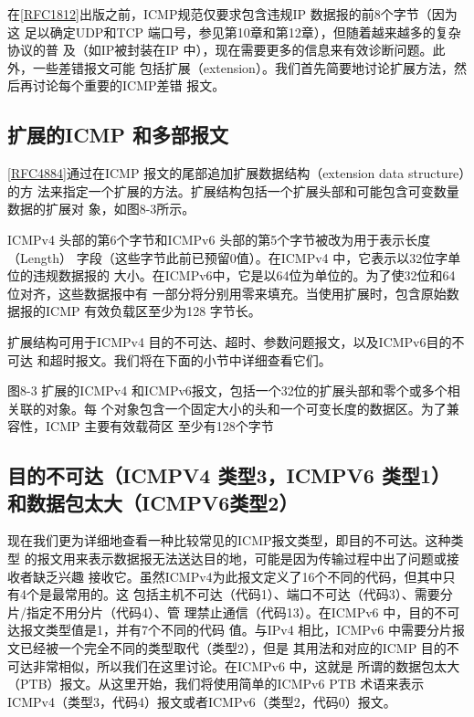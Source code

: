 在\href{https://www.rfc-editor.org/rfc/rfc1812}{[RFC1812]}出版之前，ICMP规范仅要求包含违规IP 数据报的前8个字节（因为这
足以确定UDP和TCP 端口号，参见第10章和第12章），但随着越来越多的复杂协议的普
及（如IP被封装在IP 中），现在需要更多的信息来有效诊断问题。此外，一些差错报文可能
包括扩展（extension）。我们首先简要地讨论扩展方法，然后再讨论每个重要的ICMP差错
报文。

\subsection{扩展的ICMP 和多部报文}
\href{https://www.rfc-editor.org/rfc/rfc4884}{[RFC4884]}通过在ICMP 报文的尾部追加扩展数据结构（extension data structure）的方
法来指定一个扩展的方法。扩展结构包括一个扩展头部和可能包含可变数量数据的扩展对
象，如图8-3所示。

ICMPv4 头部的第6个字节和ICMPv6 头部的第5个字节被改为用于表示长度（Length）
字段（这些字节此前已预留0值）。在ICMPv4 中，它表示以32位字单位的违规数据报的
大小。在ICMPv6中，它是以64位为单位的。为了使32位和64位对齐，这些数据报中有
一部分将分别用零来填充。当使用扩展时，包含原始数据报的ICMP 有效负载区至少为128
字节长。

扩展结构可用于ICMPv4 目的不可达、超时、参数问题报文，以及ICMPv6目的不可达
和超时报文。我们将在下面的小节中详细查看它们。

图8-3 扩展的ICMPv4 和ICMPv6报文，包括一个32位的扩展头部和零个或多个相关联的对象。每
个对象包含一个固定大小的头和一个可变长度的数据区。为了兼容性，ICMP 主要有效载荷区
至少有128个字节

\subsection{目的不可达（ICMPV4 类型3，ICMPV6 类型1）和数据包太大（ICMPV6类型2）}

现在我们更为详细地查看一种比较常见的ICMP报文类型，即目的不可达。这种类型
的报文用来表示数据报无法送达目的地，可能是因为传输过程中出了问题或接收者缺乏兴趣
接收它。虽然ICMPv4为此报文定义了16个不同的代码，但其中只有4个是最常用的。这
包括主机不可达（代码1）、端口不可达（代码3）、需要分片/指定不用分片（代码4）、管
理禁止通信（代码13）。在ICMPv6 中，目的不可达报文类型值是1，并有7个不同的代码
值。与IPv4 相比，ICMPv6 中需要分片报文已经被一个完全不同的类型取代（类型2），但是
其用法和对应的ICMP 目的不可达非常相似，所以我们在这里讨论。在ICMPv6 中，这就是
所谓的数据包太大（PTB）报文。从这里开始，我们将使用简单的ICMPv6 PTB 术语来表示
ICMPv4（类型3，代码4）报文或者ICMPv6（类型2，代码0）报文。

